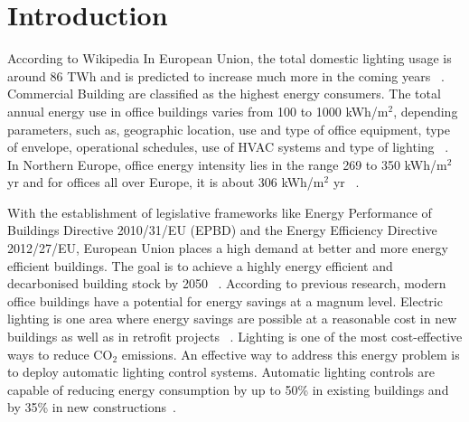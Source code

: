 \chapter{Introduction}
\label{chapter:intro}
According to Wikipedia 
In European Union, the total domestic lighting usage is around 86 TWh and is predicted to increase much more in the coming years ~\cite{nieuweling_2016}.
Commercial Building are classified as the highest energy consumers. The total annual energy use in office buildings varies from 100 to 1000 kWh/m$^{2}$, depending parameters, such as, geographic location, use and type of office equipment, type of envelope, operational schedules, use of HVAC systems and type of lighting ~\cite{santamouris2002passive}. 
In Northern Europe, office energy intensity lies in the range 269 to 350 kWh/m$^{2}$ yr and for offices all
over Europe, it is about 306 kWh/m$^{2}$ yr ~\cite{dubois2011energy}.

With the establishment of legislative frameworks like Energy Performance of Buildings Directive 2010/31/EU (EPBD) and the Energy Efficiency Directive 2012/27/EU, European Union places a high demand at better and more energy efficient buildings. The goal is to achieve a highly energy efficient and decarbonised building stock by 2050 ~\cite{fernbas_2021}.
According to previous research, modern office buildings have a potential for energy savings at a magnum level. Electric lighting is one area where energy savings are possible at a reasonable cost in new buildings as well as in retrofit projects ~\cite{dubois2011energy}. Lighting is one of the most cost-effective ways to reduce CO$_2$ emissions.
An effective way to address this energy problem is to deploy automatic lighting control systems. Automatic lighting controls are capable of reducing energy consumption by up to 50\% in existing buildings and by 35\% in new constructions~\cite{sarkar2008integrated}.

